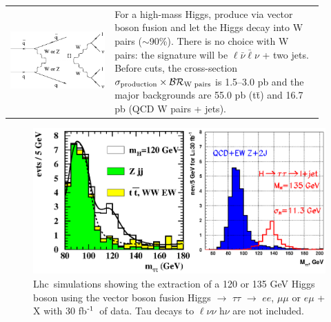 \documentclass[12pt]{article}
\def\lhc{{\sc Lhc}}
\def\ttbar{t\={t}}
\def\inv{$^{\mbox{\scriptsize -1}}$}
\begin{document}
\begin{tabular}{p{0.3\linewidth} p{0.6\linewidth}}
  \begin{minipage}{\linewidth} \centering \includegraphics[scale=0.4]{signature_HA_correct.eps} \end{minipage} &

  \begin{minipage}{\linewidth}

    For a high-mass Higgs, produce via vector boson fusion and let the
    Higgs decay into W pairs ($\sim$90\%). There is no choice with W
    pairs: the signature will be $\ell \bar{\nu} \bar{\ell} \nu$ + two
    jets. Before cuts, the cross-section $\sigma_{\mbox{\scriptsize
    production}} \times \mathcal{BR}_{\mbox{\scriptsize W pairs}}$ is
    1.5--3.0 pb and the major backgrounds are 55.0 pb (\ttbar) and
    16.7 pb (QCD W pairs + jets).

  \end{minipage} \\
\end{tabular}

\vspace{6mm}

\begin{figure}
  \begin{center}
    \includegraphics[width=\linewidth]{lhc_higgs_tau_backgrounds.eps}
  \end{center}

  \caption{\lhc\ simulations showing the extraction of a 120 or 135
  GeV Higgs boson using the vector boson fusion Higgs $\to$ $\tau\tau$
  $\to$ $ee$, $\mu\mu$ or $e\mu$ + X with 30 fb\inv\ of data. Tau
  decays to $\ell \nu \nu$ h$\nu$ are not included.}

  \label{fig:tau_backgrounds}
\end{figure}
\end{document}
